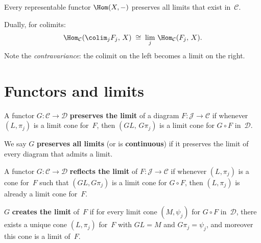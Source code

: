 \begin{corollary}\label{cor:representable-preserves-limits}
Every representable functor $\Hom(X,-)$ preserves all limits
that exist in~$\mathcal{C}$.
\end{corollary}

\begin{remark}\label{rem:colim-hom}
Dually, for colimits:
\[
    \Hom_{\mathcal{C}}(\colim_j F_j,\, X)
    \;\cong\;
    \lim_j\, \Hom_{\mathcal{C}}(F_j,\, X).
\]
Note the \emph{contravariance}: the colimit on the left becomes a
limit on the right.
\end{remark}


\section{Functors and limits}\label{sec:functors-limits}

\begin{definition}\label{def:preserve-limits}
A functor $G\colon\mathcal{C}\to\mathcal{D}$ \textbf{preserves the limit}
of a diagram $F\colon\mathcal{J}\to\mathcal{C}$ if whenever
$(L,\pi_j)$ is a limit cone for~$F$, then $(GL,\,G\pi_j)$ is a limit
cone for $G\circ F$ in~$\mathcal{D}$.

We say $G$ \textbf{preserves all limits} (or is
\textbf{continuous}) if it preserves
the limit of every diagram that admits a limit.
\end{definition}

\begin{definition}%
\label{def:reflect-create-limits}
A functor $G\colon\mathcal{C}\to\mathcal{D}$ \textbf{reflects the limit}
of $F\colon\mathcal{J}\to\mathcal{C}$ if whenever $(L,\pi_j)$ is a cone
for~$F$ such that $(GL,G\pi_j)$ is a limit cone for $G\circ F$,
then $(L,\pi_j)$ is already a limit cone for~$F$.

$G$ \textbf{creates the limit} of~$F$ if for every limit cone
$(M,\psi_j)$ for $G\circ F$ in~$\mathcal{D}$, there exists a unique
cone $(L,\pi_j)$ for~$F$ with $GL = M$ and $G\pi_j = \psi_j$,
and moreover this cone is a limit of~$F$.
\end{definition}

